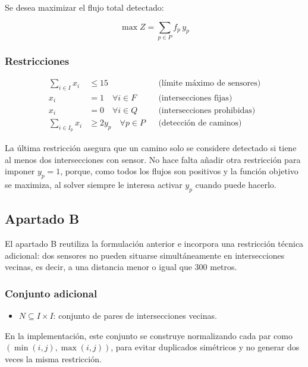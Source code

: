 \documentclass[12pt,a4paper]{article}
\begin{document}
Se desea maximizar el flujo total detectado:

\[
\max Z = \sum_{p \in P} f_p \, y_p
\]

\subsubsection{Restricciones}

\begin{align*}
\sum_{i \in I} x_i &\leq 15 && \text{(límite máximo de sensores)} \\
x_i &= 1 \quad \forall i \in F && \text{(intersecciones fijas)} \\
x_i &= 0 \quad \forall i \in Q && \text{(intersecciones prohibidas)} \\
\sum_{i \in I_p} x_i &\geq 2y_p \quad \forall p \in P && \text{(detección de caminos)}
\end{align*}



La última restricción asegura que un camino solo se considere detectado si tiene al menos dos intersecciones con sensor. No hace falta añadir otra restricción para imponer \(y_p = 1\), porque, como todos los flujos son positivos y la función objetivo se maximiza, al solver siempre le interesa activar \(y_p\) cuando puede hacerlo.

\subsection{Apartado B}

El apartado B reutiliza la formulación anterior e incorpora una restricción técnica adicional: dos sensores no pueden situarse simultáneamente en intersecciones vecinas, es decir, a una distancia menor o igual que 300 metros.

\subsubsection{Conjunto adicional}

\begin{itemize}
    \item \(N \subseteq I \times I\): conjunto de pares de intersecciones vecinas.
\end{itemize}

En la implementación, este conjunto se construye normalizando cada par como \((\min(i,j), \max(i,j))\), para evitar duplicados simétricos y no generar dos veces la misma restricción.
\end{document}
